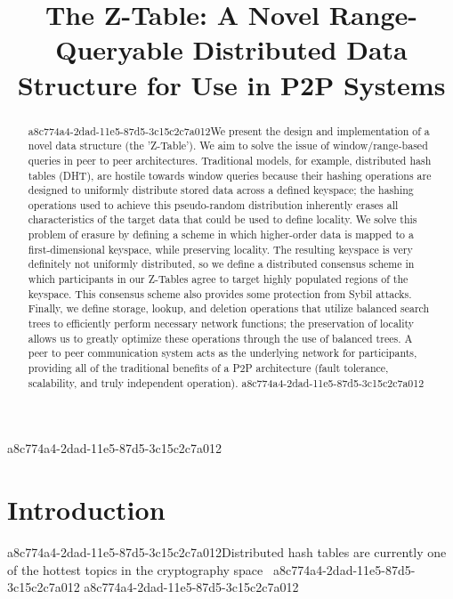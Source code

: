 \documentclass[12pt]{article}
\title{The Z-Table: A Novel Range-Queryable Distributed Data Structure for Use in P2P Systems}
\begin{document}
\maketitle
a8c774a4-2dad-11e5-87d5-3c15c2c7a012
\begin{abstract}
a8c774a4-2dad-11e5-87d5-3c15c2c7a012We present the design and implementation of a novel data structure (the 'Z-Table'). We aim to solve the issue of window/range-based queries in peer to peer architectures. Traditional models, for example,  distributed hash tables (DHT), are hostile towards window queries because their hashing operations are designed to uniformly distribute stored data across a defined keyspace; the hashing operations used to achieve this pseudo-random distribution inherently erases all characteristics of the target data that could be used to define locality. We solve this problem of erasure by defining a scheme in which higher-order data is mapped to a first-dimensional keyspace, while preserving locality. The resulting keyspace is very definitely not uniformly distributed, so we define a distributed consensus scheme in which participants in our Z-Tables agree to target highly populated regions of the keyspace. This consensus scheme also provides some protection from Sybil attacks. Finally, we define storage, lookup, and deletion operations that utilize balanced search trees to efficiently perform necessary network functions; the preservation of locality allows us to greatly optimize these operations through the use of balanced trees. A peer to peer communication system acts as the underlying network for participants, providing all of the traditional benefits of a P2P architecture (fault tolerance, scalability, and truly independent operation).
a8c774a4-2dad-11e5-87d5-3c15c2c7a012\end{abstract}


\newpage
\section{Introduction}
a8c774a4-2dad-11e5-87d5-3c15c2c7a012Distributed hash tables are currently one of the hottest topics in the cryptography space~\cite{Stoica:2001dj,Rowstron:2001ea,Ratnasamy:2001wn}
a8c774a4-2dad-11e5-87d5-3c15c2c7a012
\printbibliography
a8c774a4-2dad-11e5-87d5-3c15c2c7a012
\end{document}
